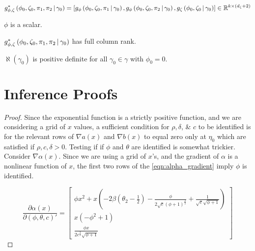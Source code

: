 \documentclass[11pt, letterpaper, twoside, final]{article}
\begin{document}
\begin{appendices}
    \begin{defn}{\popmom*}
        \begin{equation}
            g_{\phi, \zeta}^{*}\left(\phi_0, \zeta_0, \pi_1, \pi_2 \,\middle\vert\, \gamma_0\right)  =
            \left[g_{\phi}\left(\phi_0, \zeta_0, \pi_1 \,\middle\vert\, \gamma_0\right)  , g_{\phi}\left(\phi_0, \zeta_0,
            \pi_2 \,\middle\vert\, \gamma_0\right) , g_{\zeta} \left(\phi_0, \zeta_0 \,\middle\vert\, \gamma_0\right)  \right]  \in
            \mathbb{R}^{k \times (d_{\zeta} + 2)}
        \end{equation}
    \end{defn}


    \begin{assump}[GMM 4]\label{ass:GMM4}
    \begin{assumplist}
        \item $\phi$ is a scalar.
            \label{ass:GMM4a}
        \item $g_{\phi, \zeta}^{*}\left(\phi_0, \zeta_0, \pi_1, \pi_2 \,\middle\vert\, \gamma_0\right)$ has full column
            rank. 
            \label{ass:GMM4b}
        \item $\aleph(\gamma_0)$ is positive definite for all $\gamma_0 \in \gamma $ with $\phi_0 = 0$. 
            \label{ass:GMM4c}
    \end{assumplist}
    \end{assump}

    \section{Inference Proofs}

    \identifiedSet*

    \begin{proof}
    
    Since the exponential function is a strictly positive function, and we are considering a grid of $x$ values, a
    sufficient condition for $\rho, \delta$, \& $c$ to be identified is for the relevant rows of $\nabla a(x)$ and
    $\nabla b(x)$ to equal zero only at $\eta_{0}$ which are satisfied if $\rho, c, \delta > 0$.
    Testing if if $\phi$ and $\theta$ are identified is somewhat trickier. 
    Consider $\nabla \alpha(x)$. 
    Since we are using a grid of $x$'s, and the gradient of $\alpha$ is a nonlinear function of $x$, the first two
    rows of the \cref{eqn:alpha_gradient} imply $\phi$ is identified.
    
    \begin{equation}
        \label{eqn:alpha_gradient}
        \frac{\partial \alpha(x)}{\partial (\phi, \theta, c)'}  = \begin{bmatrix} \phi x^{2} + x \left(- 2 \beta
        \left(\theta_{2} - \frac{1}{2}\right) - \frac{\phi}{2 \sqrt{c} \left(\phi + 1\right)^{\frac{3}{2}}} +
        \frac{1}{\sqrt{c} \sqrt{\phi + 1}}\right) \\ x \left(- \phi^{2} + 1\right) \\ \frac{\phi x}{2
        c^{\frac{3}{2}} \sqrt{\phi + 1}} \end{bmatrix} 
    \end{equation}
    

\end{proof}
\end{appendices}
\end{document}
